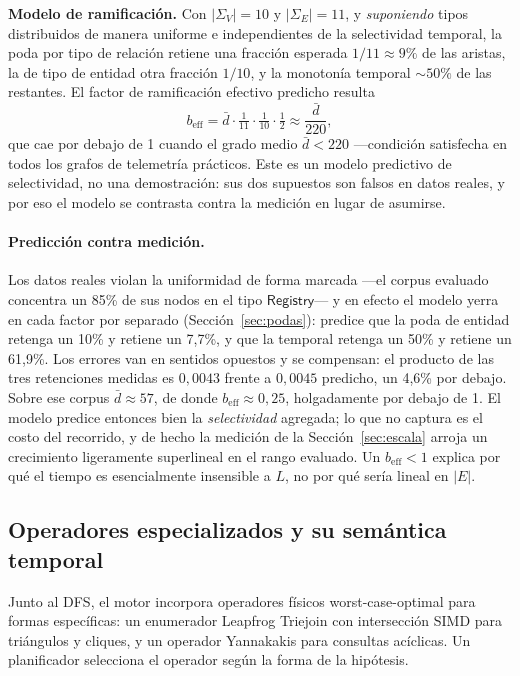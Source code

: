 \documentclass[11pt,a4paper]{article}
\begin{document}
\textbf{Modelo de ramificación.} Con $|\Sigma_V| = 10$ y $|\Sigma_E| = 11$, y
\emph{suponiendo} tipos distribuidos de manera uniforme e independientes de la
selectividad temporal, la poda por tipo de relación retiene una fracción
esperada $1/11 \approx 9\%$ de las aristas, la de tipo de entidad otra
fracción $1/10$, y la monotonía temporal ${\sim}50\%$ de las restantes. El
factor de ramificación efectivo predicho resulta
\[
b_{\mathrm{eff}} = \bar{d} \cdot \tfrac{1}{11} \cdot \tfrac{1}{10} \cdot
\tfrac{1}{2} \approx \frac{\bar{d}}{220},
\]
que cae por debajo de 1 cuando el grado medio $\bar{d} < 220$ ---condición
satisfecha en todos los grafos de telemetría prácticos. Este es un modelo
predictivo de selectividad, no una demostración: sus dos supuestos son falsos
en datos reales, y por eso el modelo se contrasta contra la medición en lugar
de asumirse.

\paragraph{Predicción contra medición.} Los datos reales violan la uniformidad
de forma marcada ---el corpus evaluado concentra un 85\% de sus nodos en el
tipo $\mathsf{Registry}$--- y en efecto el modelo yerra en cada factor por
separado (Sección~\ref{sec:podas}): predice que la poda de entidad retenga un
10\% y retiene un 7,7\%, y que la temporal retenga un 50\% y retiene un 61,9\%.
Los errores van en sentidos opuestos y se compensan: el producto de las tres
retenciones medidas es $0{,}0043$ frente a $0{,}0045$ predicho, un 4,6\% por
debajo. Sobre ese corpus $\bar{d} \approx 57$, de donde
$b_{\mathrm{eff}} \approx 0{,}25$, holgadamente por debajo de 1. El modelo
predice entonces bien la \emph{selectividad} agregada; lo que no captura es el
costo del recorrido, y de hecho la medición de la
Sección~\ref{sec:escala} arroja un crecimiento ligeramente superlineal en el
rango evaluado. Un $b_{\mathrm{eff}} < 1$ explica por qué el tiempo es
esencialmente insensible a $L$, no por qué sería lineal en $|E|$.

\subsection{Operadores especializados y su semántica temporal}
\label{sec:operadores}
Junto al DFS, el motor incorpora operadores físicos worst-case-optimal para
formas específicas: un enumerador Leapfrog Triejoin con intersección SIMD para
triángulos y cliques, y un operador Yannakakis para consultas acíclicas. Un
planificador selecciona el operador según la forma de la hipótesis.
\end{document}
